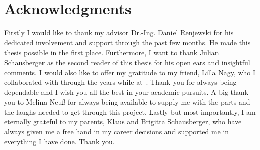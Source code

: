 
\vspace*{20mm}

\section*{Acknowledgments}

\vspace{10mm}

Firstly I would like to thank my advisor  Dr.-Ing. Daniel Renjewski for his dedicated involvement and support through the past few months. He made this thesis possible in the first place. Furthermore, I want to thank Julian Schausberger as the second reader of this thesis for his open ears and insightful comments. I would also like to offer my gratitude to my friend, Lilla Nagy, who I collaborated with through the years while at~. Thank you for always being dependable and I wish you all the best in your academic pursuits. A big thank you to Melina Neuß for always being available to supply me with the parts and the laughs needed to get through this project. Lastly but most importantly, I am eternally grateful to my parents, Klaus and Brigitta Schausberger, who have always given me a free hand in my career decisions and supported me in everything I have done. Thank you.

\cleardoublepage{}
